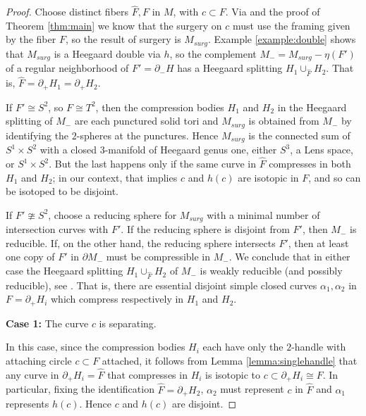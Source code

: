 \documentclass{amsart}
\newcommand{\aaa}{\mbox{$\alpha$}}
\newcommand{\bdd}{\mbox{$\partial$}}
\begin{document}
\begin{proof}   Choose distinct fibers $\hat{F}, F$ in $M$, with $c \subset F$.  Via \cite[Corollary 4.2]{ST} and the proof of Theorem \ref{thm:main} we know that the surgery on $c$ must use the framing given by the fiber $F$, so the result of surgery is $M_{surg}$.   Example \ref{example:double} shows that $M_{surg}$ is a Heegaard double via $h$, so the complement $M_- = M_{surg} - \eta(F')$ of a regular neighborhood of $F' = \bdd_- H$ has a Heegaard splitting $H_1 \cup_{\hat{F}} H_2$.  That is,  $\hat{F} = \bdd_+ H_1 = \bdd_+ H_2$.

If $F' \cong S^2$, so $F \cong T^2$, then the compression bodies $H_1$ and $H_2$ in the Heegaard splitting of $M_-$ are each punctured solid tori and $M_{surg}$ is obtained from $M_-$ by identifying the $2$-spheres at the punctures.  Hence $M_{surg}$ is the connected sum of $S^1 \times S^2$ with a closed $3$-manifold of Heegaard genus one, either $S^3$, a Lens space, or $S^1 \times S^2$.  But the last happens only if the same curve in $\hat{F}$ compresses in both $H_1$ and $H_2$; in our context, that implies $c$ and $h(c)$ are isotopic in $F$, and so can be isotoped to be disjoint.

If $F' \ncong S^2$, choose a reducing sphere for $M_{surg}$ with a minimal number of intersection curves with $F'$.  If the reducing sphere is disjoint from $F'$, then $M_-$ is reducible. If, on the other hand, the reducing sphere intersects $F'$, then at least one copy of $F'$ in $\bdd M_-$ must be compressible in $M_-$.  We conclude that in either case the Heegaard splitting $H_1 \cup_{\hat{F}} H_2$ of $M_-$ is weakly reducible (and possibly reducible), see \cite{CG}.  That is, there are essential disjoint simple closed curves $\aaa_1, \aaa_2$ in $F = \bdd_+ H_i$ which compress respectively in $H_1$ and $H_2$.

 \medskip

{\bf Case 1:}  The curve $c$ is separating.

In this case, since the compression bodies $H_i$ each have only the $2$-handle with attaching circle $c \subset F$ attached, it follows from Lemma \ref{lemma:singlehandle} that any curve in $\bdd _+ H_i = \hat{F}$ that compresses in $H_i$ is isotopic to $c \subset \bdd_+ H_i \cong F$.  In particular, fixing the identification $\hat{F} = \bdd_+ H_2$, $\aaa_2$  must represent $c$ in $\hat{F}$ and $\aaa_1$ represents $h(c)$.  Hence $c$ and $h(c)$ are disjoint.

\medskip


\end{proof}
\end{document}
